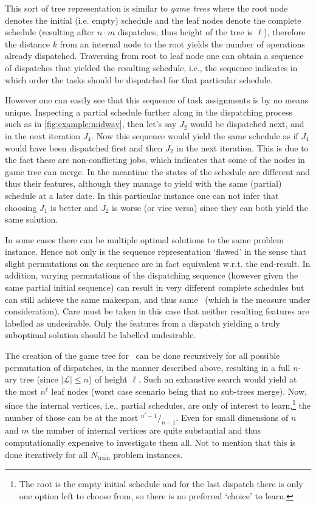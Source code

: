 This sort of tree representation is similar to \emph{game trees} 
\citep[cf.][]{Rosen03} where the root node denotes the initial (i.e. empty) 
schedule and the leaf nodes denote the complete schedule (resulting after 
$n\cdot m$ dispatches, thus height of the tree is $\ell$), therefore the 
distance $k$ from an internal node to the root yields the number of operations 
already dispatched. Traversing from root to leaf node one can obtain a sequence 
of dispatches that yielded the resulting schedule, i.e., the sequence indicates 
in which order the tasks should be dispatched for that particular schedule. 

However one can easily see that this sequence of task assignments is by no 
means unique. 
Inspecting a partial schedule further along in the dispatching process such as 
in \cref{fig:example:midway}, then let's say $J_2$ would be dispatched next, 
and in the next iteration $J_4$. 
Now this sequence would yield the same schedule as if $J_4$ would have been 
dispatched first and then $J_2$ in the next iteration. 
This is due to the fact these are non-conflicting jobs, which indicates that 
some of the nodes in game tree can merge. 
In the meantime the states of the schedule are different and thus their 
features, although they manage to yield with the same (partial) schedule at a 
later date.  %
In this particular instance one can not infer that choosing $J_1$ is better and 
$J_2$ is worse (or vice versa) since they can both yield the same solution.

In some cases there can be multiple optimal solutions to the same problem 
instance. 
Hence not only is the sequence representation `flawed' in the sense that slight 
permutations on the sequence are in fact equivalent w.r.t. the end-result.
In addition, varying permutations of the dispatching sequence (however given 
the same partial initial sequence) can result in very different complete 
schedules but can still achieve the same makespan, and thus same \fullnamerho\ 
(which is the measure under consideration). 
Care must be taken in this case that neither resulting features are labelled as 
undesirable. 
Only the features from a dispatch yielding a truly suboptimal solution should 
be labelled undesirable. 

The creation of the game tree for \jsp\ can be done recursively for all 
possible permutation of dispatches, in the manner described above, resulting in 
a full \mbox{$n$-ary} tree (since $|\mathcal{L}|\leq n$) of height $\ell$. Such 
an exhaustive search would yield at the most $n^{\ell}$ leaf nodes (worst case 
scenario being that no sub-trees merge). Now, since the internal vertices, 
i.e., partial schedules, are only of interest to learn,\footnote{The root is 
  the empty initial schedule and for the last dispatch there is only one option 
  left to choose from, so there is no preferred `choice' to learn.} the number 
  of 
those can be at the most \mbox{${}^{n^{\ell}-1}/_{n-1}$}.
Even for small dimensions of $n$ and $m$ the number of internal vertices are 
quite substantial and thus computationally expensive to investigate them all. 
Not to mention that this is done iteratively for all $N_{\text{train}}$ problem 
instances.

